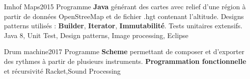 %
%
%


\begin{projects}
	\project
	{Imhof Maps}{2015}
		{}
	{Programme \textbf{Java} générant des cartes avec relief d'une région à partir de données OpenStreeMap et de fichier .hgt contenant l'altitude. Designs patterns utilisés : \textbf{Builder}, \textbf{Iterator}, \textbf{Immutabilité}. Tests unitaires extensifs.}
	{Java 8, Unit Test, Design patterns, Image processing, Eclipse}
				
	\project
	{Drum machine}{2017}
	{}
	{Programme \textbf{Scheme} permettant de composer et d'exporter des rythmes à partir de plusieurs instruments. \textbf{Programmation fonctionnelle} et  récursivité}
	{Racket,Sound Processing}

\end{projects}